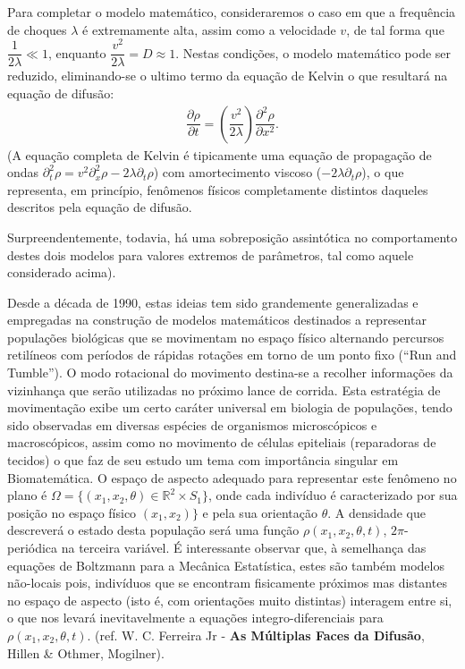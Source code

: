 Para completar o modelo matemático, consideraremos o caso em que a frequência de choques \(\lambda\) é extremamente alta, assim como a velocidade \(v\), de tal forma que \(\dfrac{1}{2\lambda} \ll 1\), enquanto \(\dfrac{v^2}{2\lambda} = D \approx 1\). Nestas condições, o modelo matemático pode ser reduzido, eliminando-se o ultimo termo da equação de Kelvin o que resultará na equação de difusão:
\begin{eqnarray}
\dfrac{\partial \rho}{\partial t} = \left(\dfrac{v^2}{2\lambda}\right) \dfrac{\partial^2 \rho}{\partial x^2}.
\end{eqnarray}
(A equação completa de Kelvin é tipicamente uma equação de propagação de ondas \(\partial_t^2\rho = v^2 \partial_x^2\rho - 2\lambda \partial_t\rho\)) com amortecimento viscoso (\(-2\lambda\partial_t\rho\)), o que representa, em princípio, fenômenos físicos completamente distintos daqueles descritos pela equação de difusão.

Surpreendentemente, todavia, há uma sobreposição assintótica no comportamento destes dois modelos para valores extremos de parâmetros, tal como aquele considerado acima).

Desde a década de 1990, estas ideias tem sido grandemente generalizadas e empregadas na construção de modelos matemáticos destinados a representar populações biológicas que se movimentam no espaço físico alternando percursos retilíneos com períodos de rápidas rotações em torno de um ponto fixo (``Run and Tumble''). O modo rotacional do movimento destina-se a recolher informações da vizinhança que serão utilizadas no próximo lance de corrida. Esta estratégia de movimentação exibe um certo caráter universal em biologia de populações, tendo sido observadas em diversas espécies de organismos microscópicos e macroscópicos, assim como no movimento de células epiteliais (reparadoras de tecidos) o que faz de seu estudo um tema com importância singular em Biomatemática. O espaço de aspecto adequado para representar este fenômeno no plano é \(\Omega = \{(x_1, x_2, \theta) \in \mathbb{R}^2 \times S_1\}\), onde cada indivíduo é caracterizado por sua posição no espaço físico \((x_1, x_2)\}\) e pela sua orientação \(\theta\). A densidade que descreverá o estado desta população será uma função \(\rho(x_1, x_2, \theta, t)\), \(2\pi\)-periódica na terceira variável. É interessante observar que, à semelhança das equações de Boltzmann para a Mecânica Estatística, estes são também modelos não-locais pois, indivíduos que se encontram fisicamente próximos mas distantes no espaço de aspecto (isto é, com orientações muito distintas) interagem entre si, o que nos levará inevitavelmente a equações integro-diferenciais para \(\rho(x_1, x_2, \theta, t)\). (ref. W. C. Ferreira Jr - \textbf{As Múltiplas Faces da Difusão}, Hillen \& Othmer, Mogilner).

